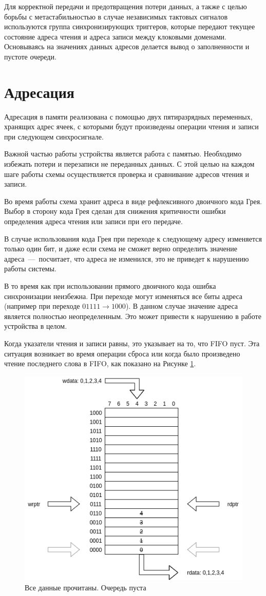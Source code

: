 Для корректной передачи и предотвращения потери данных, а также с целью борьбы с метастабильностью в случае независимых тактовых сигналов используются группа синхронизирующих триггеров, которые передают текущее состояние адреса чтения и адреса записи между клоковыми доменами. Основываясь на значениях данных адресов делается вывод о заполненности и пустоте очереди. 

\section{Адресация}

Адресация в памяти реализована с помощью двух пятиразрядных переменных, хранящих адрес ячеек,  с которыми будут произведены операции чтения и записи при следующем синхросигнале.

Важной частью работы устройства является работа с памятью. Необходимо избежать потери и перезаписи не переданных данных. С этой целью на каждом шаге работы схемы осуществляется проверка и сравнивание адресов чтения и записи.

Во время работы схема хранит адреса в виде рефлексивного двоичного кода Грея. Выбор в сторону кода Грея сделан для снижения критичности ошибки определения адреса чтения или записи при его передаче. 

В случае использования кода Грея при переходе к следующему адресу изменяется только один бит, и даже если схема не сможет верно определить значение адреса~---~посчитает, что адреса не изменился, это не приведет к нарушению работы системы. 

В то время как при использовании прямого двоичного кода ошибка синхронизации неизбежна. При переходе могут изменяться все биты адреса (например при переходе $01111 \to 1000$). В данном случае значение адреса является полностью неопределенным. Это может привести к нарушению в работе устройства в целом.

Когда указатели чтения и записи равны, это указывает на то, что FIFO пуст. Эта ситуация возникает во время операции сброса или когда было произведено чтение последнего слова в FIFO, как показано на Рисунке \ref{fig:empty-fifo}.

\begin{figure}[h!]
	\centering
	\includegraphics[width=0.7\linewidth]{course-scheme/images/empty-fifo}
	\caption{Все данные прочитаны. Очередь пуста}
	\label{fig:empty-fifo}
\end{figure}

